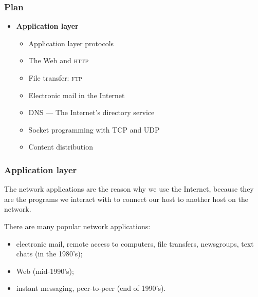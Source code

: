 
%
\begin{frame}
\frametitle{Plan}

\begin{itemize}

  \item \textbf{Application layer}

  \begin{itemize}

    \item Application layer protocols

    \item The Web and \textsc{http}

    \item File transfer: \textsc{ftp}

    \item Electronic mail in the Internet

    \item DNS --- The Internet's directory service

    \item Socket programming with TCP and UDP

    \item Content distribution

  \end{itemize}

\end{itemize}

\end{frame}

%
\begin{frame}
\frametitle{Application layer}

The network applications are the reason why we use the Internet,
because they are the programs we interact with to connect our host
to another host on the network.

\bigskip

There are many popular network applications:
\begin{itemize}

  \item electronic mail, remote access to computers, file
  transfers, newsgroups, text chats (in the 1980's);
  
  \item Web (mid-1990's);

  \item instant messaging, peer-to-peer (end of 1990's).

\end{itemize}

\end{frame}

